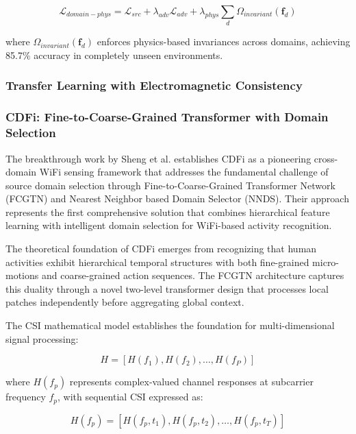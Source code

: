 \documentclass[journal]{IEEEtran}
\begin{document}
\begin{equation}
\mathcal{L}_{domain-phys} = \mathcal{L}_{src} + \lambda_{adv} \mathcal{L}_{adv} + \lambda_{phys} \sum_{d} \Omega_{invariant}(\mathbf{f}_d)
\label{eq:domain_physics_loss}
\end{equation}

where $\Omega_{invariant}(\mathbf{f}_d)$ enforces physics-based invariances across domains, achieving 85.7\% accuracy in completely unseen environments.

\subsubsection{Transfer Learning with Electromagnetic Consistency}

\subsubsection{CDFi: Fine-to-Coarse-Grained Transformer with Domain Selection}

The breakthrough work by Sheng et al. \cite{sheng2024cdfi} establishes CDFi as a pioneering cross-domain WiFi sensing framework that addresses the fundamental challenge of source domain selection through Fine-to-Coarse-Grained Transformer Network (FCGTN) and Nearest Neighbor based Domain Selector (NNDS). Their approach represents the first comprehensive solution that combines hierarchical feature learning with intelligent domain selection for WiFi-based activity recognition.

The theoretical foundation of CDFi emerges from recognizing that human activities exhibit hierarchical temporal structures with both fine-grained micro-motions and coarse-grained action sequences. The FCGTN architecture captures this duality through a novel two-level transformer design that processes local patches independently before aggregating global context.

The CSI mathematical model establishes the foundation for multi-dimensional signal processing:

\begin{equation}
H = [H(f_1), H(f_2), \ldots, H(f_P)]
\label{eq:cdfi_csi_model}
\end{equation}

where $H(f_p)$ represents complex-valued channel responses at subcarrier frequency $f_p$, with sequential CSI expressed as:

\begin{equation}
H(f_p) = [H(f_p, t_1), H(f_p, t_2), \ldots, H(f_p, t_T)]
\label{eq:cdfi_sequential_csi}
\end{equation}
\end{document}
